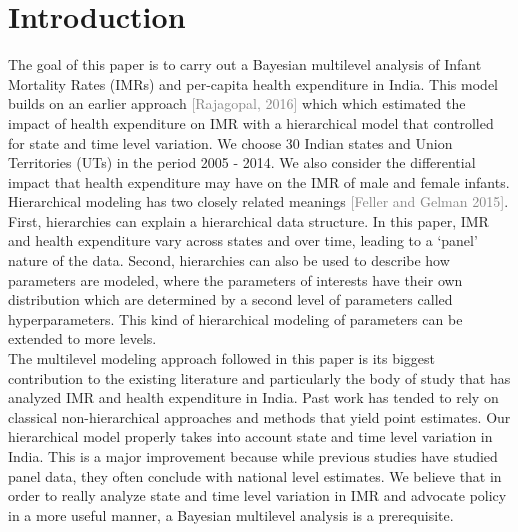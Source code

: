 \documentclass{article}
\begin{document}
\section{Introduction}
\label{S:1}
The goal of this paper is to carry out a Bayesian multilevel analysis of Infant Mortality Rates (IMRs) and per-capita health expenditure in India. This model builds on an earlier approach \textcolor{gray}{[Rajagopal, 2016]} which which estimated the impact of health expenditure on IMR with a hierarchical model that controlled for state and time level variation. We choose 30 Indian states and Union Territories (UTs) in the period 2005 - 2014. We also consider the differential impact that health expenditure may have on the IMR of male and female infants.\\
Hierarchical modeling has two closely related meanings \textcolor{gray}{[Feller and Gelman 2015]}. First, hierarchies can explain a hierarchical data structure.  In this paper, IMR and health expenditure vary across states and over time, leading to a `panel' nature of the data. Second, hierarchies can also be used to describe how parameters are modeled, where the parameters of interests have their own distribution which are determined by a second level of parameters called hyperparameters. This kind of hierarchical modeling of parameters can be extended to more levels.\\
The multilevel modeling approach followed in this paper is its biggest contribution to the existing literature and particularly the body of study that has analyzed IMR and health expenditure in India. Past work has tended to rely on classical non-hierarchical approaches and methods that yield point estimates. Our hierarchical model properly takes into account state and time level variation in India. This is a major improvement because while previous studies have studied panel data, they often conclude with national level estimates. We believe that in order to really analyze state and time level variation in IMR and advocate policy in a more useful manner, a Bayesian multilevel analysis is a prerequisite.\\
\end{document}
